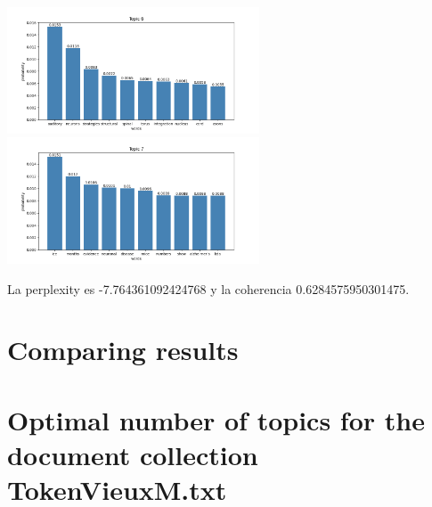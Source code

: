 \documentclass[10pt]{article} %
\begin{document}
\begin{center}
		\includegraphics[width=7.5cm]{images/plots/test_8_no_stopwords/topic_6.png}
		\includegraphics[width=7.5cm]{images/plots/test_8_no_stopwords/topic_7.png}
	\end{center}

	La perplexity es -7.764361092424768 y la coherencia  0.6284575950301475.
	
	\section{Comparing results}
	
	
	\section{Optimal number of topics for the document collection TokenVieuxM.txt}
	
	
\end{document}

